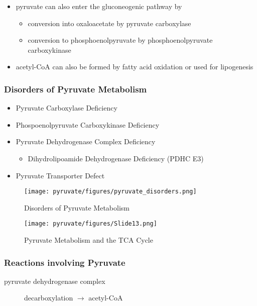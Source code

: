 \documentclass[12pt]{scrartcl}
\begin{document}
\begin{itemize}
\item pyruvate can also enter the gluconeogenic pathway by
\begin{itemize}
\item conversion into oxaloacetate by pyruvate carboxylase
\item conversion to phosphoenolpyruvate by phosphoenolpyruvate carboxykinase
\end{itemize}
\item acetyl-CoA can also be formed by fatty acid oxidation or used for
lipogenesis
\end{itemize}


\subsubsection{Disorders of Pyruvate Metabolism}
\label{sec:orgd9c04cf}
\begin{itemize}
\item Pyruvate Carboxylase Deficiency
\item Phospoenolpyruvate Carboxykinase Deficiency
\item Pyruvate Dehydrogenase Complex Deficiency
\begin{itemize}
\item Dihydrolipoamide Dehydrogenase Deficiency (PDHC E3)
\end{itemize}
\item Pyruvate Transporter Defect
\end{itemize}

\begin{figure}[htbp]
\centering
\texttt{[image: pyruvate/figures/pyruvate\_disorders.png]}
\caption[TCA]{\label{fig:orgce326d6}Disorders of Pyruvate Metabolism}
\end{figure}


\begin{figure}[htbp]
\centering
\texttt{[image: pyruvate/figures/Slide13.png]}
\caption[TCA]{\label{fig:orge51a5b3}Pyruvate Metabolism and the TCA Cycle}
\end{figure}

\subsubsection{Reactions involving Pyruvate}
\label{sec:orgc1ff912}

\begin{description}
\item[{pyruvate dehydrogenase complex}] decarboxylation \(\to\) acetyl-CoA
\end{description}
\end{document}
